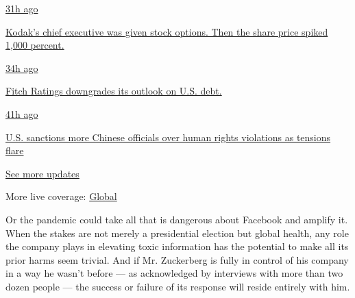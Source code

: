\href{https://www.nytimes.com/live/2020/07/31/business/stock-market-today-coronavirus?action=click\&pgtype=Article\&state=default\&region=MAIN_CONTENT_1\&context=storylines_live_updates\#kodaks-chief-executive-was-given-stock-options-then-the-share-price-spiked-1000-percent}{31h
ago}

\href{https://www.nytimes.com/live/2020/07/31/business/stock-market-today-coronavirus?action=click\&pgtype=Article\&state=default\&region=MAIN_CONTENT_1\&context=storylines_live_updates\#kodaks-chief-executive-was-given-stock-options-then-the-share-price-spiked-1000-percent}{Kodak's
chief executive was given stock options. Then the share price spiked
1,000 percent.}

\href{https://www.nytimes.com/live/2020/07/31/business/stock-market-today-coronavirus?action=click\&pgtype=Article\&state=default\&region=MAIN_CONTENT_1\&context=storylines_live_updates\#fitch-ratings-downgrades-its-outlook-on-us-debt}{34h
ago}

\href{https://www.nytimes.com/live/2020/07/31/business/stock-market-today-coronavirus?action=click\&pgtype=Article\&state=default\&region=MAIN_CONTENT_1\&context=storylines_live_updates\#fitch-ratings-downgrades-its-outlook-on-us-debt}{Fitch
Ratings downgrades its outlook on U.S. debt.}

\href{https://www.nytimes.com/live/2020/07/31/business/stock-market-today-coronavirus?action=click\&pgtype=Article\&state=default\&region=MAIN_CONTENT_1\&context=storylines_live_updates\#us-sanctions-more-chinese-officials-over-human-rights-violations-as-tensions-flare}{41h
ago}

\href{https://www.nytimes.com/live/2020/07/31/business/stock-market-today-coronavirus?action=click\&pgtype=Article\&state=default\&region=MAIN_CONTENT_1\&context=storylines_live_updates\#us-sanctions-more-chinese-officials-over-human-rights-violations-as-tensions-flare}{U.S.
sanctions more Chinese officials over human rights violations as
tensions flare}

\href{https://www.nytimes.com/live/2020/07/31/business/stock-market-today-coronavirus?action=click\&pgtype=Article\&state=default\&region=MAIN_CONTENT_1\&context=storylines_live_updates}{See
more updates}

More live coverage:
\href{https://www.nytimes.com/2020/08/01/world/coronavirus-covid-19.html?action=click\&pgtype=Article\&state=default\&region=MAIN_CONTENT_1\&context=storylines_live_updates}{Global}

Or the pandemic could take all that is dangerous about Facebook and
amplify it. When the stakes are not merely a presidential election but
global health, any role the company plays in elevating toxic information
has the potential to make all its prior harms seem trivial. And if Mr.
Zuckerberg is fully in control of his company in a way he wasn't before
--- as acknowledged by interviews with more than two dozen people ---
the success or failure of its response will reside entirely with him.

